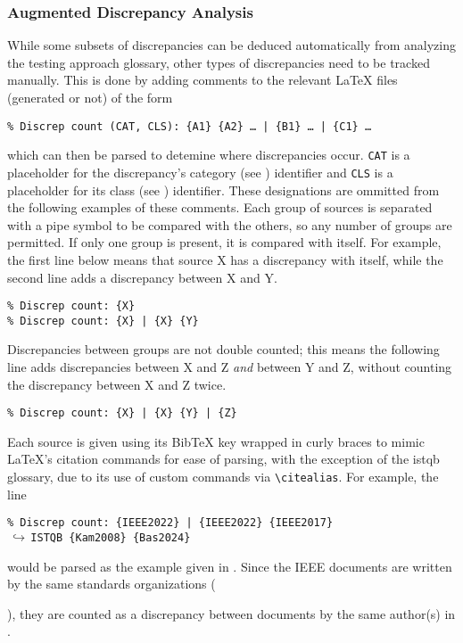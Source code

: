 \subsubsection{Augmented Discrepancy Analysis}
\label{aug-discrep-analysis}
While some subsets of discrepancies can be deduced automatically from analyzing
the testing approach glossary, other types of discrepancies need to be tracked
manually. This is done by adding
comments to the relevant \LaTeX{} files (generated or not) of the form
\begin{displayquote}
    \texttt{\% Discrep count (CAT, CLS): \{A1\} \{A2\} \dots{} | \{B1\}
        \dots{} | \{C1\} %
        \dots}
\end{displayquote}
which can then be parsed to detemine where discrepancies occur. \texttt{CAT} is
a placeholder for the discrepancy's category (see )
identifier and \texttt{CLS} is a placeholder for its class (see
) identifier. These designations are ommitted
from the following examples of these comments. Each group of
sources is separated with a pipe symbol to be compared with the others, so any
number of groups are permitted. If only one group is present, it is compared
with itself. For example, the first line below means that source X has a
discrepancy with itself, while the second line adds a discrepancy between X and Y.
\begin{displayquote}
    \texttt{\% Discrep count: \{X\}\\\% Discrep count: \{X\} | \{X\} \{Y\}}
\end{displayquote}
Discrepancies between groups are not double counted; this means the following
line adds discrepancies between X and Z \emph{and} between Y and Z, without
counting the discrepancy between X and Z twice.
\begin{displayquote}
    \texttt{\% Discrep count: \{X\} | \{X\} \{Y\} | \{Z\}}
\end{displayquote}
Each source is given using its BibTeX key wrapped in curly braces to mimic
\LaTeX{}'s citation commands for ease of parsing, with the exception of the
\acs{istqb} glossary, due to its use of custom commands via
\texttt{\textbackslash citealias}. For example, the line
\begin{displayquote}
    \texttt{\% Discrep count: \{IEEE2022\} | \{IEEE2022\} \{IEEE2017\}\\
        $\,\hookrightarrow\,$\quad ISTQB \{Kam2008\} \{Bas2024\}}
\end{displayquote}
would be parsed as the example given in . Since
the IEEE documents are written by the same standards organizations
(\begin{NoHyper}\citeauthor{IEEE2022}\end{NoHyper}), they are counted as a
discrepancy between documents by the same author(s) in .

